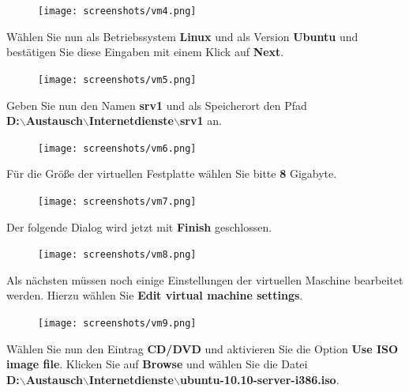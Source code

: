 \begin{figure}[H]
\begin{center}
\texttt{[image: screenshots/vm4.png]}
\end{center}
\end{figure}

\pagebreak
Wählen Sie nun als Betriebssystem \textbf{Linux} und als Version \textbf{Ubuntu} und bestätigen Sie diese
Eingaben mit einem Klick auf \textbf{Next}.

\begin{figure}[H]
\begin{center}
\texttt{[image: screenshots/vm5.png]}
\end{center}
\end{figure}

Geben Sie nun den Namen \textbf{srv1} und als Speicherort den Pfad \\ \textbf{D:$\backslash$Austausch$\backslash$Internetdienste$\backslash$srv1} an.

\begin{figure}[H]
\begin{center}
\texttt{[image: screenshots/vm6.png]}
\end{center}
\end{figure}

\pagebreak
Für die Größe der virtuellen Festplatte wählen Sie bitte \textbf{8} Gigabyte.

\begin{figure}[H]
\begin{center}
\texttt{[image: screenshots/vm7.png]}
\end{center}
\end{figure}

Der folgende Dialog wird jetzt mit \textbf{Finish} geschlossen.

\begin{figure}[H]
\begin{center}
\texttt{[image: screenshots/vm8.png]}
\end{center}
\end{figure}

\pagebreak
Als nächsten müssen noch einige Einstellungen der virtuellen Maschine bearbeitet werden. Hierzu wählen Sie
\textbf{Edit virtual machine settings}.

\begin{figure}[H]
\begin{center}
\texttt{[image: screenshots/vm9.png]}
\end{center}
\end{figure}
Wählen Sie nun den Eintrag \textbf{CD/DVD} und aktivieren Sie die Option \textbf{Use ISO image file}. Klicken Sie auf \textbf{Browse}
und wählen Sie die Datei \\ \textbf{D:$\backslash$Austausch$\backslash$Internetdienste$\backslash$ubuntu-10.10-server-i386.iso}.

